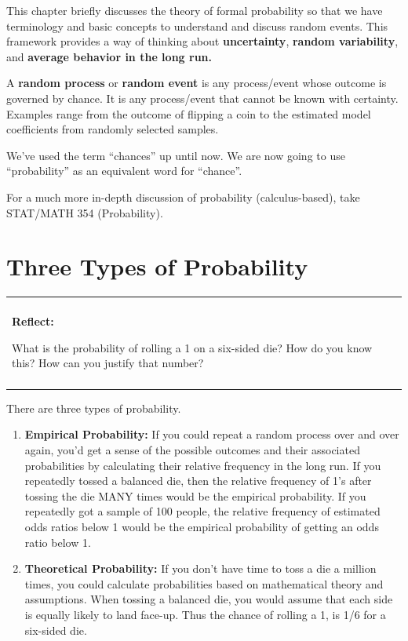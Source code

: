 \documentclass[
]{book}
\newenvironment{reflect}
{
    \begin{center}
    
    \begin{tabular}{|p{0.8\textwidth}|}
    \rowcolor{LightBlue}
    \hline\\
    \rowcolor{LightBlue}
    \textbf{Reflect:}
}
{
    \\\rowcolor{LightBlue}
    \\\hline
    \end{tabular} 
    \end{center}
}
\begin{document}
This chapter briefly discusses the theory of formal probability so that we have terminology and basic concepts to understand and discuss random events. This framework provides a way of thinking about \textbf{uncertainty}, \textbf{random variability}, and \textbf{average behavior in the long run.}

A \textbf{random process} or \textbf{random event} is any process/event whose outcome is governed by chance. It is any process/event that cannot be known with certainty. Examples range from the outcome of flipping a coin to the estimated model coefficients from randomly selected samples.

We've used the term ``chances'' up until now. We are now going to use ``probability'' as an equivalent word for ``chance''.

For a much more in-depth discussion of probability (calculus-based), take STAT/MATH 354 (Probability).

\hypertarget{three-types-of-probability}{%
\section{Three Types of Probability}\label{three-types-of-probability}}

\begin{reflect}
What is the probability of rolling a 1 on a six-sided die? How do you
know this? How can you justify that number?
\end{reflect}

There are three types of probability.

\begin{enumerate}
\def\labelenumi{\arabic{enumi}.}
\item
  \textbf{Empirical Probability:} If you could repeat a random process over and over again, you'd get a sense of the possible outcomes and their associated probabilities by calculating their relative frequency in the long run. If you repeatedly tossed a balanced die, then the relative frequency of 1's after tossing the die MANY times would be the empirical probability. If you repeatedly got a sample of 100 people, the relative frequency of estimated odds ratios below 1 would be the empirical probability of getting an odds ratio below 1.
\item
  \textbf{Theoretical Probability:} If you don't have time to toss a die a million times, you could calculate probabilities based on mathematical theory and assumptions. When tossing a balanced die, you would assume that each side is equally likely to land face-up. Thus the chance of rolling a 1, is 1/6 for a six-sided die.
\end{enumerate}
\end{document}
